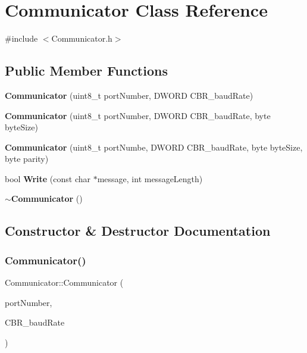 \section{Communicator Class Reference}
\label{class_communicator}


{\ttfamily \#include $<$Communicator.\+h$>$}

\subsection*{Public Member Functions}
\begin{DoxyCompactItemize}
\item 
\textbf{ Communicator} (uint8\+\_\+t port\+Number, D\+W\+O\+RD C\+B\+R\+\_\+baud\+Rate)
\item 
\textbf{ Communicator} (uint8\+\_\+t port\+Number, D\+W\+O\+RD C\+B\+R\+\_\+baud\+Rate, byte byte\+Size)
\item 
\textbf{ Communicator} (uint8\+\_\+t port\+Numbe, D\+W\+O\+RD C\+B\+R\+\_\+baud\+Rate, byte byte\+Size, byte parity)
\item 
bool \textbf{ Write} (const char $\ast$message, int message\+Length)
\item 
\textbf{ $\sim$\+Communicator} ()
\end{DoxyCompactItemize}


\subsection{Constructor \& Destructor Documentation}
\mbox{\label{class_communicator_aacc43c8cc9fc1d2d6d8f55f18f3a6a69}} 
\subsubsection{Communicator()\hspace{0.1cm}{\footnotesize\ttfamily [1/3]}}
{\footnotesize\ttfamily Communicator\+::\+Communicator (\begin{DoxyParamCaption}\item[{uint8\+\_\+t}]{port\+Number,  }\item[{D\+W\+O\+RD}]{C\+B\+R\+\_\+baud\+Rate }\end{DoxyParamCaption})}

\mbox{\label{class_communicator_ac3274a4f40c669f4db2e7fe4f239d018}} 
